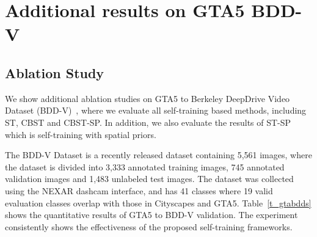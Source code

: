 \documentclass[runningheads]{llncs}
\begin{document}
\section{Additional results on GTA5  BDD-V}
\subsection{Ablation Study} 
We show additional ablation studies on GTA5 to Berkeley DeepDrive Video Dataset (BDD-V)~\cite{nexar}, where we evaluate all self-training based methods, including ST, CBST and CBST-SP. In addition, we also evaluate the results of ST-SP which is self-training with spatial priors.

The BDD-V Dataset is a recently released dataset containing 5,561  images, where the dataset is divided into 3,333 annotated training images, 745 annotated validation images and 1,483 unlabeled test images. The dataset was collected using the NEXAR dashcam interface, and has 41 classes where 19 valid evaluation classes overlap with those in Cityscapes and GTA5. Table~\ref{t_gtabdds} shows the quantitative results of GTA5 to BDD-V validation. The experiment consistently shows the effectiveness of the proposed self-training frameworks.
\end{document}
